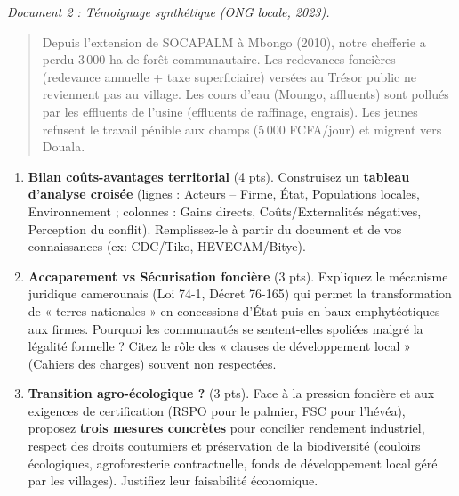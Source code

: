 \documentclass[11pt]{article}
\begin{document}
\begin{exercice}
\emph{Document 2 : Témoignage synthétique (ONG locale, 2023).}
\begin{quote}
\og Depuis l'extension de SOCAPALM à Mbongo (2010), notre chefferie a perdu 3\,000 ha de forêt communautaire. Les redevances foncières (redevance annuelle + taxe superficiaire) versées au Trésor public ne reviennent pas au village. Les cours d'eau (Moungo, affluents) sont pollués par les effluents de l'usine (effluents de raffinage, engrais). Les jeunes refusent le travail pénible aux champs (5\,000 FCFA/jour) et migrent vers Douala. \fg
\end{quote}

\begin{enumerate}
\item \textbf{Bilan coûts-avantages territorial} (4 pts). Construisez un \textbf{tableau d'analyse croisée} (lignes : Acteurs -- Firme, État, Populations locales, Environnement ; colonnes : Gains directs, Coûts/Externalités négatives, Perception du conflit). Remplissez-le à partir du document et de vos connaissances (ex: CDC/Tiko, HEVECAM/Bitye).
\item \textbf{Accaparement vs Sécurisation foncière} (3 pts). Expliquez le mécanisme juridique camerounais (Loi 74-1, Décret 76-165) qui permet la transformation de « terres nationales » en concessions d'État puis en baux emphytéotiques aux firmes. Pourquoi les communautés se sentent-elles spoliées malgré la légalité formelle ? Citez le rôle des « clauses de développement local » (Cahiers des charges) souvent non respectées.
\item \textbf{Transition agro-écologique ?} (3 pts). Face à la pression foncière et aux exigences de certification (RSPO pour le palmier, FSC pour l'hévéa), proposez \textbf{trois mesures concrètes} pour concilier rendement industriel, respect des droits coutumiers et préservation de la biodiversité (couloirs écologiques, agroforesterie contractuelle, fonds de développement local géré par les villages). Justifiez leur faisabilité économique.
\end{enumerate}
\end{exercice}
\end{document}
